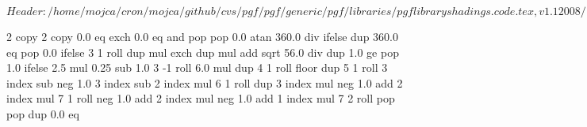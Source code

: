 %
%
%

\ProvidesFileRCS[v\pgfversion] $Header: /home/mojca/cron/mojca/github/cvs/pgf/pgf/generic/pgf/libraries/pgflibraryshadings.code.tex,v 1.1 2008/10/29 21:58:24 tantau Exp $


%
%

{\pgfpoint{-2cm}{-2cm}}
{\pgfpoint{2cm}{2cm}}
{}
{ %
  2 copy %
  2 copy 0.0 eq exch 0.0 eq and
  { pop pop 0.0 } %
  {atan 360.0 div} %
  ifelse  %
  dup 360.0 eq { pop 0.0 }{} ifelse %
  3 1 roll %
  dup mul %
  exch dup mul %
  add sqrt %
  56.0 div %
  dup 1.0 ge %
  { pop 1.0 }{} ifelse %
  2.5 mul 0.25 sub %
  1.0 %
  3 -1 roll 6.0 mul dup 4 1 roll %
  floor %
  dup 5 1 roll %
  3 index sub neg %
  1.0 3 index sub %
  2 index mul %
  6 1 roll %
  dup 3 index mul neg 1.0 add %
  2 index mul %
  7 1 roll %
  neg 1.0 add %
  2 index mul neg 1.0  add %
  1 index mul %
  7 2 roll %
  pop pop %
  dup 0.0 eq %
}
